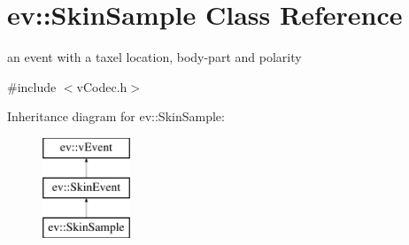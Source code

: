 \hypertarget{classev_1_1SkinSample}{}\section{ev\+:\+:Skin\+Sample Class Reference}
\label{classev_1_1SkinSample}


an event with a taxel location, body-\/part and polarity  




{\ttfamily \#include $<$v\+Codec.\+h$>$}

Inheritance diagram for ev\+:\+:Skin\+Sample\+:\begin{figure}[H]
\begin{center}
\leavevmode
\includegraphics[height=3.000000cm]{classev_1_1SkinSample}
\end{center}
\end{figure}

